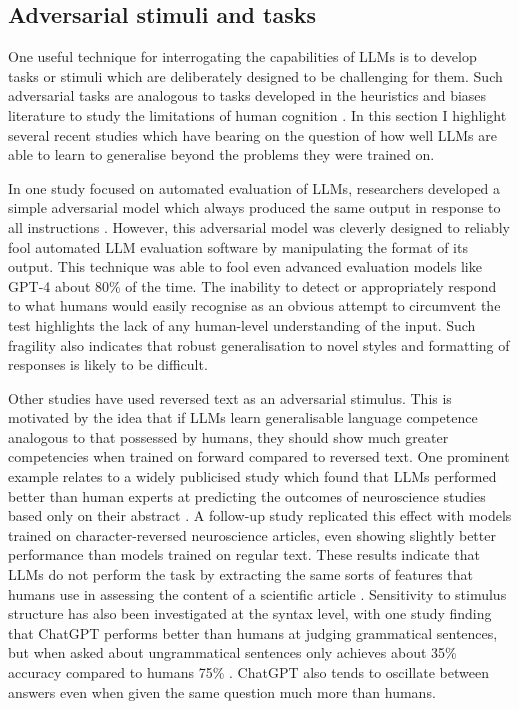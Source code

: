 \documentclass{article}
\begin{document}
\subsection{Adversarial stimuli and tasks}

One useful technique for interrogating the capabilities of LLMs is to develop tasks or stimuli which are deliberately designed to be challenging for them. Such adversarial tasks are analogous to tasks developed in the heuristics and biases literature to study the limitations of human cognition \citep{west2008heuristics}. In this section I highlight several recent studies which have bearing on the question of how well LLMs are able to learn to generalise beyond the problems they were trained on.

In one study focused on automated evaluation of LLMs, researchers developed a simple adversarial model which always produced the same output in response to all instructions \citep{zheng2024cheating}. However, this adversarial model was cleverly designed to reliably fool automated LLM evaluation software by manipulating the format of its output. This technique was able to fool even advanced evaluation models like GPT-4 about 80\% of the time. The inability to detect or appropriately respond to what humans would easily recognise as an obvious attempt to circumvent the test highlights the lack of any human-level understanding of the input. Such fragility also indicates that robust generalisation to novel styles and formatting of responses is likely to be difficult.

Other studies have used reversed text as an adversarial stimulus. This is motivated by the idea that if LLMs learn generalisable language competence analogous to that possessed by humans, they should show much greater competencies when trained on forward compared to reversed text. One prominent example relates to a widely publicised study which found that LLMs performed better than human experts at predicting the outcomes of neuroscience studies based only on their abstract \citep{luo2024large}. A follow-up study replicated this effect with models trained on character-reversed neuroscience articles, even showing slightly better performance than models trained on regular text. These results indicate that LLMs do not perform the task by extracting the same sorts of features that humans use in assessing the content of a scientific article \citep{luo2024beyond}. Sensitivity to stimulus structure has also been investigated at the syntax level, with one study finding that ChatGPT performs better than humans at judging grammatical sentences, but when asked about ungrammatical sentences only achieves about 35\% accuracy compared to humans 75\% \citep{dentella2023systematic}. ChatGPT also tends to oscillate between answers even when given the same question much more than humans.
\end{document}
